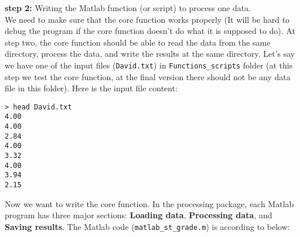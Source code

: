 
\textbf{step 2:} Writing the Matlab function (or script) to process one data. \\

\noindent
We need to make sure that the core function works properly (It will be hard to debug the program if the core function doesn't do what it is supposed to do). At step two, the core function should be able to read the data from the same directory, process the data, and write the results at the same directory. Let's say we have one of the input files (\texttt{David.txt}) in \texttt{Functions\_scripts} folder (at this step we test the core function, at the final version there should not be any data file in this folder). Here is the input file content:

\begin{mdframed}[hidealllines=true,backgroundcolor=gray!20]
\begin{singlespace}
\fontsize{10pt}{1pt}
\texttt{> head David.txt \\
4.00 \\
4.00 \\
2.84 \\
4.00 \\
3.32 \\
4.00 \\
3.94 \\
2.15 
 }
\end{singlespace}
\end{mdframed}

\noindent
Now we want to write the core function. In the processing package, each Matlab program has three major sections: \textbf{Loading data}, \textbf{Processing data},  and \textbf{Saving results}. The Matlab code (\texttt{matlab\_st\_grade.m}) is according to below:


